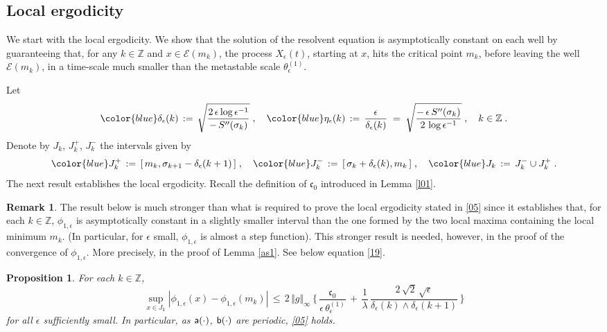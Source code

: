 \documentclass[reqno]{amsart}
\theoremstyle{plain}
\newtheorem{proposition}[theorem]{Proposition}
\theoremstyle{definition}
\newtheorem{remark}[theorem]{Remark}
\newcommand{\mf}[1]{{\mathfrak #1}}
\newcommand{\bb}[1]{{\mathbb #1}}
\newcommand{\ms}[1]{{\mathscr #1}}
\newcommand{\mss}[1]{{\textsf #1}}
\newcounter{as}[section]
\newcommand{\<}{\langle}
\renewcommand{\>}{\rangle}
\begin{document}
\subsection*{Local ergodicity}

We start with the local ergodicity.  We show that the solution of the
resolvent equation is asymptotically constant on each well by
guaranteeing that, for any $k\in \bb Z$ and $x\in \ms E(m_{k})$, the
process $X_{\epsilon}(t)$, starting at $x$, hits the critical point
$m_{k}$, before leaving the well $\ms E(m_{k})$, in a time-scale much
smaller than the metastable scale $\theta^{(1)}_{\epsilon}$.

Let
\begin{equation}
\label{14}
{\color{blue} \delta_{\epsilon}(k)}
\,:=\,  \sqrt{\frac{2\, \epsilon \log
\epsilon^{-1}}{-\, S''(\sigma_{k})}}\;,
\quad
{\color{blue} \eta_{\epsilon}(k)}
\,:=\, \frac{\epsilon}{\delta_{\epsilon}(k)}
\;=\;
\sqrt{\frac{-\, \epsilon \, S''(\sigma_{k})}
{2 \,  \log \epsilon^{-1}}}\;,
\quad k\in \bb Z\;.
\end{equation}
Denote by $J_k$, $J^+_k$, $J^-_k$ the intervals given by
\begin{equation*}
{\color{blue} J^+_k} \,:=\,
[\, m_k, \sigma_{k+1} - \delta_{\epsilon}(k+1)\, ]\;, \quad
{\color{blue} J^-_k} \, :=\,  [\,\sigma_k + \delta_{\epsilon}(k),
m_k\, ]\;, \quad
{\color{blue} J_k} \, := \, J^-_k \cup J^+_k\;.
\end{equation*}
The next result establishes the local ergodicity. Recall the
definition of $\mf c_0$ introduced in Lemma \ref{l01}.

\begin{remark}
The result below is much stronger than what is required to prove the
local ergodicity stated in \eqref{05} since it establishes that, for
each $k\in \bb Z$, $\phi_{1,\epsilon}$ is asymptotically constant in a
slightly smaller interval than the one formed by the two local maxima
containing the local minimum $m_k$. (In particular, for $\epsilon$
small, $\phi_{1,\epsilon}$ is almost a step function). This stronger
result is needed, however, in the proof of the convergence of
$\phi_{1,\epsilon}$. More precisely, in the proof of Lemma
\ref{as1}. See below equation \eqref{19}.
\end{remark}

\begin{proposition}
\label{l06}
For each $k\in \bb Z$, 
\begin{equation*}
\sup_{x\in  J_k}
|\phi_{1,\epsilon}(x) - \phi_{1,\epsilon}(m_{k})| \,\le\,
2\, \Vert g\Vert_\infty\, \Big\{\,
\frac{\mf c_0}{\epsilon\, \theta^{(1)}_\epsilon}
\,+\, \frac{1}{\lambda} \,
\frac{2 \, \sqrt{2} \, \sqrt{\epsilon}}
{\delta_\epsilon (k) \wedge \delta_\epsilon (k+1) } \,\Big\}
\end{equation*}
for all $\epsilon$ sufficiently small. In particular, as
$\mss a(\cdot)$, $\mss b(\cdot)$ are periodic, \eqref{05} holds.
\end{proposition}
\end{document}
